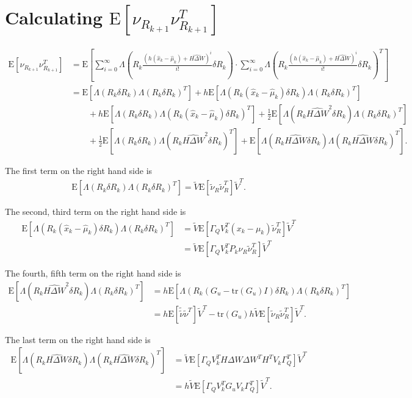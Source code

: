 \documentclass[10pt]{article}
\newcommand{\tr}[1]{\ensuremath{\mathrm{tr}\left( #1 \right)}}
\newcommand{\expect}[1]{\ensuremath{\mathrm{E}\left[ #1 \right]}}
\begin{document}
\section{Calculating $\expect{\nu_{R_{k+1}}\nu_{R_{k+1}}^T}$}

\begin{align*}
	\expect{\nu_{R_{k+1}}\nu_{R_{k+1}}^T} &= \expect{\sum_{i=0}^\infty \Lambda\left(R_k \frac{\left(h(\hat{x}_k-\hat{\mu}_k) + \widehat{H\Delta W}\right)^i}{i!}\delta R_k\right) \cdot \sum_{i=0}^\infty \Lambda\left(R_k \frac{\left(h(\hat{x}_k-\hat{\mu}_k) + \widehat{H\Delta W}\right)^i}{i!}\delta R_k\right)^T} \\
	&= \expect{\Lambda(R_k\delta R_k)\Lambda(R_k\delta R_k)^T} + h\expect{\Lambda(R_k(\hat{x}_k-\hat{\mu}_k)\delta R_k)\Lambda(R_k\delta R_k)^T} \\
	&\qquad + h\expect{\Lambda(R_k\delta R_k)\Lambda(R_k(\hat{x}_k-\hat{\mu}_k)\delta R_k)^T} + \frac{1}{2}\expect{\Lambda(R_k\widehat{H\Delta W}^2\delta R_k)\Lambda(R_k\delta R_k)^T} \\
	&\qquad + \frac{1}{2}\expect{\Lambda(R_k\delta R_k)\Lambda(R_k\widehat{H\Delta W}^2\delta R_k)^T} + \expect{\Lambda(R_k\widehat{H\Delta W}\delta R_k)\Lambda(R_k\widehat{H\Delta W}\delta R_k)^T}.
\end{align*}

\noindent The first term on the right hand side is
\begin{align*}
	\expect{\Lambda(R_k\delta R_k)\Lambda(R_k\delta R_k)^T} = \tilde{V}\expect{\tilde{\nu}_R\tilde{\nu}_R^T}\tilde{V}^T.
\end{align*}

\noindent The second, third term on the right hand side is
\begin{align*}
	\expect{\Lambda(R_k(\hat{x}_k-\hat{\mu}_k)\delta R_k)\Lambda(R_k\delta R_k)^T} &= \tilde{V}\expect{\Gamma_QV_k^T(x_k-\mu_k)\tilde{\nu}_R^T}\tilde{V}^T \\
	&= \tilde{V}\expect{\Gamma_QV_k^TP_k\nu_R\tilde{\nu}_R^T}\tilde{V}^T
\end{align*}

\noindent The fourth, fifth term on the right hand side is
\begin{align*}
	\expect{\Lambda(R_k\widehat{H\Delta W}^2\delta R_k)\Lambda(R_k\delta R_k)^T} &= h\expect{\Lambda(R_k(G_u-\tr{G_u}I)\delta R_k)\Lambda(R_k\delta R_k)^T} \\
	&= h\expect{\tilde{\tilde{\nu}}\tilde{\nu}^T}\tilde{V}^T - \tr{G_u}h\tilde{V}\expect{\tilde{\nu}_R\tilde{\nu}_R^T}\tilde{V}^T.
\end{align*}

\noindent The last term on the right hand side is
\begin{align*}
	\expect{\Lambda(R_k\widehat{H\Delta W}\delta R_k)\Lambda(R_k\widehat{H\Delta W}\delta R_k)^T} &= \tilde{V}\expect{\Gamma_QV_k^TH\Delta W\Delta W^TH^TV_k\Gamma_Q^T}\tilde{V}^T \\
	&= h\tilde{V}\expect{\Gamma_QV_k^TG_uV_k\Gamma_Q^T}\tilde{V}^T.
\end{align*}
\end{document}
